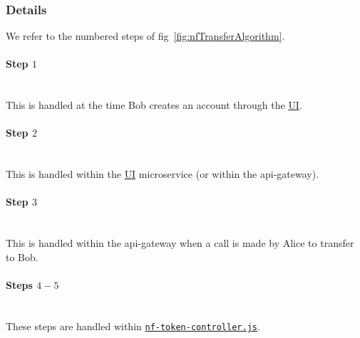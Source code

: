 \documentclass{article}
\begin{document}
\newpage
\subsubsection{Details}
\label{sec:721TransferDetails}

We refer to the numbered steps of fig~\ref{fig:nfTransferAlgorithm}.

\paragraph{Step $1$}
\ \\
This is handled at the time Bob creates an account through the \hyperref[sec:ui]{UI}.

\paragraph{Step $2$}
\ \\
This is handled within the \hyperref[sec:ui]{UI} microservice (or within the api-gateway).

\paragraph{Step $3$}
\ \\
This is handled within the api-gateway when a call is made by Alice to transfer to Bob.

\paragraph{Steps $4 - 5$}
\ \\
These steps are handled within \hyperref[sec:nf-token-controller]{\texttt{nf-token-controller.js}}.
\end{document}

